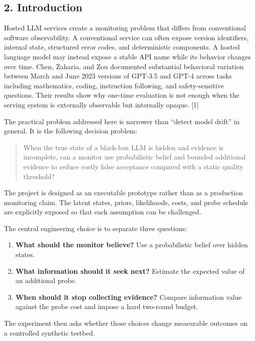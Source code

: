 \documentclass[
]{article}
\providecommand{\tightlist}{%
  \setlength{\itemsep}{0pt}\setlength{\parskip}{0pt}}
\begin{document}
\subsection{2. Introduction}\label{introduction}

Hosted LLM services create a monitoring problem that differs from
conventional software observability. A conventional service can often
expose version identifiers, internal state, structured error codes, and
deterministic components. A hosted language model may instead expose a
stable API name while its behavior changes over time. Chen, Zaharia, and
Zou documented substantial behavioral variation between March and June
2023 versions of GPT-3.5 and GPT-4 across tasks including mathematics,
coding, instruction following, and safety-sensitive questions. Their
results show why one-time evaluation is not enough when the serving
system is externally observable but internally opaque. {[}1{]}

The practical problem addressed here is narrower than ``detect model
drift'' in general. It is the following decision problem:

\begin{quote}
When the true state of a black-box LLM is hidden and evidence is
incomplete, can a monitor use probabilistic belief and bounded
additional evidence to reduce costly false acceptance compared with a
static quality threshold?
\end{quote}

The project is designed as an executable prototype rather than as a
production monitoring claim. The latent states, priors, likelihoods,
costs, and probe schedule are explicitly exposed so that each assumption
can be challenged.

The central engineering choice is to separate three questions:

\begin{enumerate}
\def\labelenumi{\arabic{enumi}.}
\tightlist
\item
  \textbf{What should the monitor believe?} Use a probabilistic belief
  over hidden states.
\item
  \textbf{What information should it seek next?} Estimate the expected
  value of an additional probe.
\item
  \textbf{When should it stop collecting evidence?} Compare information
  value against the probe cost and impose a hard two-round budget.
\end{enumerate}

The experiment then asks whether those choices change measurable
outcomes on a controlled synthetic testbed.
\end{document}
